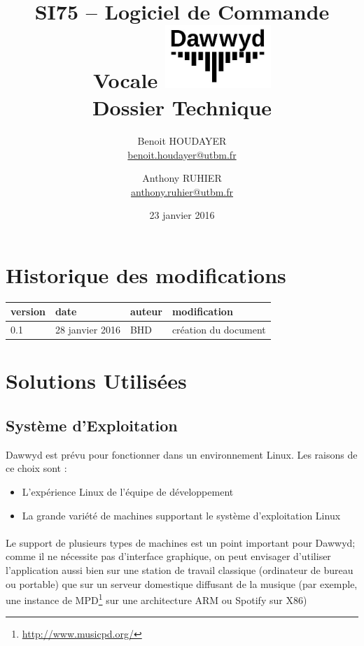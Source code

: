 \documentclass[12pt]{article}
\title{\vspace{-1cm}\textbf{%
    SI75 -- Logiciel de Commande Vocale \vspace{0.5cm}
    \protect\includegraphics[width=4cm]{logo.jpg}\\[0.5em]
    Dossier Technique}}
\author{Benoit HOUDAYER \\ \href{mailto:benoit.houdayer@utbm.fr}{benoit.houdayer@utbm.fr}
\and Anthony RUHIER \\ \href{mailto:anthony.ruhier@utbm.fr}{anthony.ruhier@utbm.fr}}
\date{23 janvier 2016}
\begin{document}
    \maketitle
    \thispagestyle{empty}
    \tableofcontents
    \listoffigures

    \section*{Historique des modifications}

    \begin{table}[H]
    \centering

    \begin{tabular}{|l|l|l|l|}
        \hline
        version & date & auteur & modification \\
        \hline
        0.1 & 28 janvier 2016 & BHD & création du document \\
        \hline
    \end{tabular}
    \end{table}

    \afterpage{\cfoot{\thepage}}
    \newpage

    \section{Solutions Utilisées}
	    \subsection{Système d'Exploitation}
	    Dawwyd est prévu pour fonctionner dans un environnement Linux. Les raisons de ce choix sont :
	    \begin{itemize}
	    	\item L'expérience Linux de l'équipe de développement
	    	\item La grande variété de machines supportant le système d'exploitation Linux
	    \end{itemize}
	    
	    \paragraph{}
	    Le support de plusieurs types de machines est un point important pour Dawwyd; comme il ne nécessite pas d'interface graphique, on peut envisager d'utiliser l'application aussi bien sur une station de travail classique (ordinateur de bureau ou portable) que sur un serveur domestique diffusant de la musique (par exemple, une instance de MPD\footnote{\url{http://www.musicpd.org/}} sur une architecture ARM ou Spotify sur X86)
	    
\end{document}
